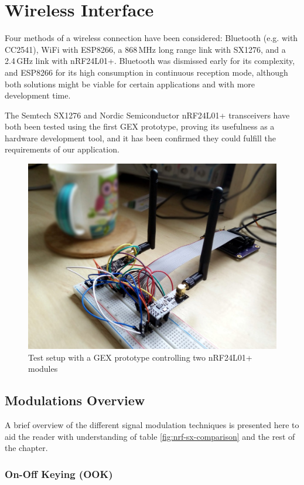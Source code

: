 \chapter{Wireless Interface} \label{sec:wireless}

Four methods of a wireless connection have been considered: Bluetooth (e.g. with CC2541), WiFi with ESP8266, a 868\,MHz long range link with SX1276, and a 2.4\,GHz link with nRF24L01+. Bluetooth was dismissed early for its complexity, and ESP8266 for its high consumption in continuous reception mode, although both solutions might be viable for certain applications and with more development time. 

The Semtech SX1276 \cite{semtech-manual} and Nordic Semiconductor nRF24L01+  \cite{nrf-manual} transceivers have both been tested using the first GEX prototype, proving its usefulness as a hardware development tool, and it has been confirmed they could fulfill the requirements of our application.

\begin{figure}[h]
	\centering
	\includegraphics[width=.7\textwidth]{img/nrf-testing.jpg}
	\caption{Test setup with a GEX prototype controlling two nRF24L01+ modules}
\end{figure}

\section{Modulations Overview}

A brief overview of the different signal modulation techniques is presented here to aid the reader with understanding of table \ref{fig:nrf-sx-comparison} and the rest of the chapter.

\subsection{On-Off Keying (OOK)}

